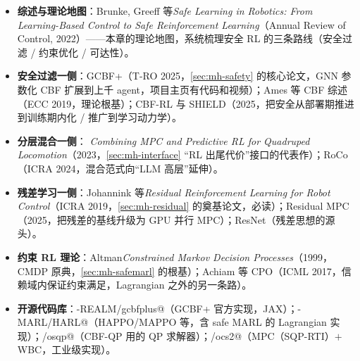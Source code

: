 \begin{itemize}
  \item \textbf{综述与理论地图}：Brunke, Greeff 等\emph{Safe Learning in Robotics: From Learning-Based Control to Safe Reinforcement Learning}（Annual Review of Control, 2022\cite{brunke2022safe}）——本章的理论地图，系统梳理安全 RL 的三条路线（安全过滤 / 约束优化 / 可达性）。
  \item \textbf{安全过滤一侧}：GCBF+\cite{zhang2025gcbfplus}（T-RO 2025，\cref{sec:mh-safety} 的核心论文，GNN 参数化 CBF 扩展到上千 agent，项目主页有代码和视频）；Ames 等 CBF 综述\cite{ames2019cbf}（ECC 2019，理论根基）；CBF-RL\cite{gandhi2023shield} 与 SHIELD\cite{yin2023shield}（2025，把安全从部署期推进到训练期内化 / 推广到学习动力学）。
  \item \textbf{分层混合一侧}：%
  \emph{Combining MPC and Predictive RL for Quadruped Locomotion}\cite{bjelonic2023mpcrl}（2023，\cref{sec:mh-interface} “RL 出尾代价”接口的代表作）；RoCo\cite{mandi2024roco}（ICRA 2024，混合范式向“LLM 高层”延伸）。
  \item \textbf{残差学习一侧}：Johannink 等\emph{Residual Reinforcement Learning for Robot Control}\cite{johannink2019residual}（ICRA 2019，\cref{sec:mh-residual} 的奠基论文，必读）；Residual MPC\cite{residualmpc2025}（2025，把残差的基线升级为 GPU 并行 MPC）；ResNet\cite{he2016resnet}（残差思想的源头）。
  \item \textbf{约束 RL 理论}：Altman\emph{Constrained Markov Decision Processes}\cite{altman1999cmdp}（1999，CMDP 原典，\cref{sec:mh-safemarl} 的根基）；Achiam 等 CPO\cite{achiam2017constrained}（ICML 2017，信赖域内保证约束满足，Lagrangian 之外的另一条路）。
  \item \textbf{开源代码库}：\verb@MIT-REALM/gcbfplus@（GCBF+ 官方实现，JAX）；\verb@PKU-MARL/HARL@（HAPPO/MAPPO 等，含 safe MARL 的 Lagrangian 实现）；\verb@osqp/osqp@（CBF-QP 用的 QP 求解器）；\verb@leggedrobotics/ocs2@（MPC（SQP-RTI）$+$ WBC，工业级实现）。
\end{itemize}

